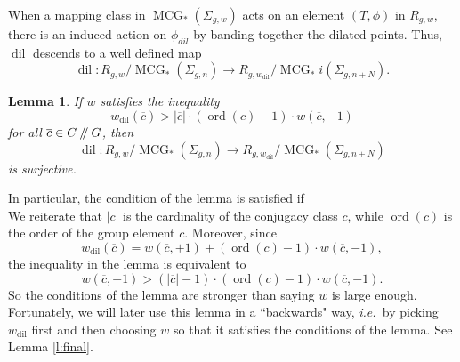 \documentclass[10pt,twocolumn,amsmath,amssymb,aps,pra,secnumarabic,
    nofootinbib,groupedaddress]{revtex4-1}
\newtheorem{lemma}[theorem]{Lemma}
\newcommand{\ie}{\emph{i.e.~}}
\newcommand{\sslash}{\mathbin{/\mkern-5mu/}}
\newcommand{\ord}{\operatorname{ord}}
\newcommand{\dil}{\operatorname{dil}}
\newcommand{\MCG}{\operatorname{MCG}}
\begin{document}
When a mapping class in $\MCG_*(\Sigma_{g,w})$ acts on an element $(T,\phi)$ in $R_{g,w}$, there is an induced action on $\phi_{dil}$ by banding together the dilated points.  Thus, $\dil$ descends to a well defined map
\[ \dil: R_{g,w}/\MCG_*(\Sigma_{g,n}) \to R_{g,w_{\dil}}/\MCG_*i(\Sigma_{g,n+N}). \]

\begin{lemma}
If $w$ satisfies the inequality
\[ w_{\dil}(\overline{c}) > |\overline{c}|\cdot (\ord(c)-1) \cdot w(\overline{c},-1)\]
for all $\overline{c} \in C\sslash G$, then
\[ \dil: R_{g,w}/\MCG_*(\Sigma_{g,n}) \to R_{g,w_{\dil}}/\MCG_*(\Sigma_{g,n+N}) \]
is surjective.
\label{l:dilation}
\end{lemma}

In particular, the condition of the lemma is satisfied if
\[ \]
We reiterate that $|\overline{c}|$ is the cardinality of the conjugacy class $\overline{c}$, while $\ord(c)$ is the order of the group element $c$.  Moreover, since
\[ w_{\dil}(\overline{c}) = w(\overline{c},+1) + (\ord(c)-1) \cdot w(\overline{c},-1), \]
the inequality in the lemma is equivalent to
\[ w(\overline{c},+1) > (|\overline{c}|-1)\cdot (\ord(c)-1) \cdot w(\overline{c},-1). \]
So the conditions of the lemma are stronger than saying $w$ is large enough.  Fortunately, we will later use this lemma in a ``backwards" way, \ie by picking $w_{\dil}$ first and then choosing $w$ so that it satisfies the conditions of the lemma.  See Lemma \ref{l:final}.
\end{document}
